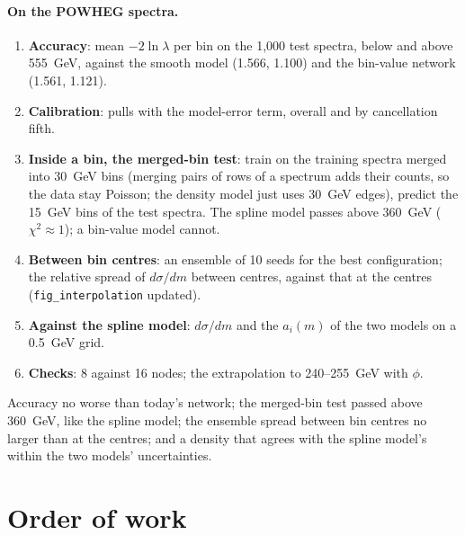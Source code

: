 \documentclass[11pt]{article}
\newcommand{\file}[1]{\nolinkurl{#1}}
\begin{document}
\paragraph{On the POWHEG spectra.}
\begin{enumerate}
  \item \textbf{Accuracy}: mean $-2\ln\lambda$ per bin on the 1,000 test spectra, below and above
    555~GeV, against the smooth model (1.566, 1.100) and the bin-value network (1.561, 1.121).
  \item \textbf{Calibration}: pulls with the model-error term, overall and by cancellation fifth.
  \item \textbf{Inside a bin, the merged-bin test}: train on the training spectra merged into 30~GeV
    bins (merging pairs of rows of a spectrum adds their counts, so the data stay Poisson; the
    density model just uses 30~GeV edges), predict the 15~GeV bins of the test spectra. The
    spline model passes above 360~GeV ($\chi^2 \approx 1$); a bin-value model cannot.
  \item \textbf{Between bin centres}: an ensemble of 10 seeds for the best configuration; the
    relative spread of $d\sigma/dm$ between centres, against that at the centres
    (\file{fig_interpolation} updated).
  \item \textbf{Against the spline model}: $d\sigma/dm$ and the $a_i(m)$ of the two models on a
    0.5~GeV grid.
  \item \textbf{Checks}: 8 against 16 nodes; the extrapolation to 240--255~GeV with $\phi$.
\end{enumerate}

\begin{keyidea}
Accuracy no worse than today's network; the merged-bin test passed above 360~GeV, like the
spline model; the ensemble spread between bin centres no larger than at the centres; and a
density that agrees with the spline model's within the two models' uncertainties.
\end{keyidea}

\section{Order of work}
\label{sec:order}
\end{document}
